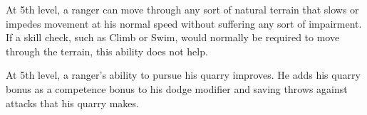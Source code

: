 \begin{comment}
\begin{dtable}
\lcaption{Ranger Spells Known}
\begin{tabularx}{\columnwidth}{X *{4}{>{\ccol}X}}
& \multicolumn{4}{c}{\thead{---{}---{}---{}---{}---Spell Level---{}---{}---{}---{}---}} \\
\thead{Level} & \thead{1st} & \thead{2nd} & \thead{3rd} & \thead{4th} \\
1st  & \x & \x & \x & \x \\
2nd  & \x & \x & \x & \x \\
3rd  & \x & \x & \x & \x \\
4th  & 1 & \x & \x & \x \\
5th  & 2 & \x & \x & \x \\
6th  & 2 & \x & \x & \x \\
7th  & 3 & \x & \x & \x \\
8th  & 3 & 1 & \x & \x \\
9th  & 3 & 2 & \x & \x \\
10th & 4 & 2 & \x & \x \\
11th & 4 & 2 & 1 & \x \\
12th & 4 & 3 & 2 & \x \\
13th & 4 & 3 & 2 & \x \\
14th & 4 & 3 & 2 & 1 \\
15th & 4 & 3 & 3 & 2 \\
16th & 4 & 3 & 3 & 2 \\
17th & 4 & 3 & 3 & 2 \\
18th & 4 & 3 & 3 & 3 \\
19th & 4 & 3 & 3 & 3 \\
20th & 4 & 3 & 3 & 3 \\
\end{tabularx}
\end{dtable}
\end{comment}

 At 5th level, a ranger can move through any sort of natural terrain that slows or impedes movement at his normal speed without suffering any sort of impairment. If a skill check, such as Climb or Swim, would normally be required to move through the terrain, this ability does not help.

 At 5th level, a ranger's ability to pursue his quarry improves. He adds his quarry bonus as a competence bonus to his dodge modifier and saving throws against attacks that his quarry makes.

